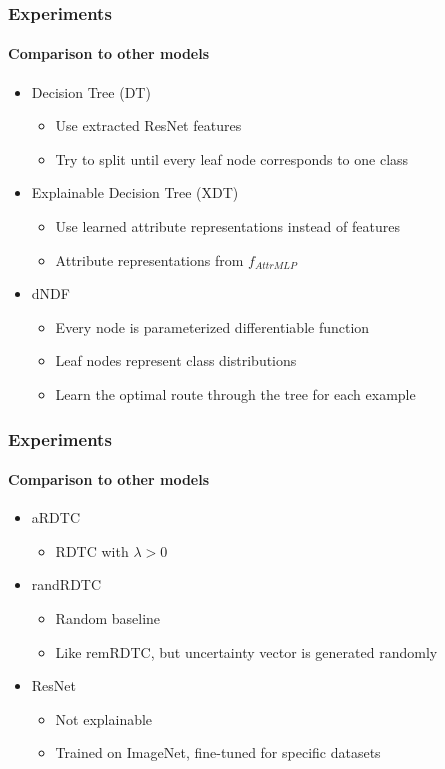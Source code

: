 \documentclass[9pt]{beamer}
\begin{document}
\begin{frame}
\frametitle{Experiments}
\framesubtitle{Comparison to other models}
\begin{itemize}
	\item Decision Tree (DT)
	\begin{itemize}
		\item Use extracted ResNet features
		\item Try to split until every leaf node corresponds to one class
	\end{itemize}
	\item Explainable Decision Tree (XDT)
	\begin{itemize}
		\item Use learned attribute representations instead of features
		\item Attribute representations from $f_{AttrMLP}$
	\end{itemize}
	\item dNDF \cite{kontschieder2015deep}
\begin{itemize}
	\item Every node is parameterized differentiable function
	\item Leaf nodes represent class distributions
	\item Learn the optimal route through the tree for each example
\end{itemize}
\end{itemize}
\end{frame}
\begin{frame}
\frametitle{Experiments}
\framesubtitle{Comparison to other models}
\begin{itemize}
	\item aRDTC
	\begin{itemize}
		\item RDTC with $\lambda>0$
	\end{itemize}
	\item randRDTC
	\begin{itemize}
		\item Random baseline
		\item Like remRDTC, but uncertainty vector is generated randomly
	\end{itemize}
	\item ResNet
	\begin{itemize}
		\item Not explainable
		\item Trained on ImageNet, fine-tuned for specific datasets
	\end{itemize}
\end{itemize}
\end{frame}
\end{document}
